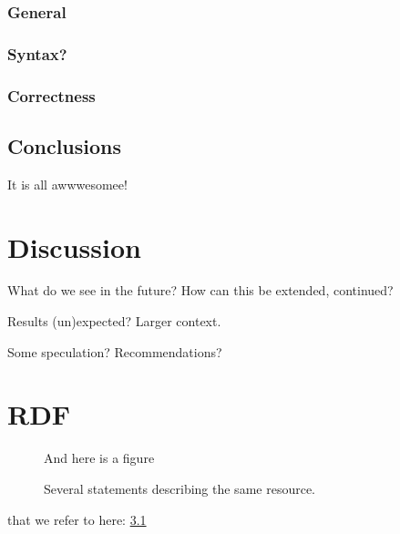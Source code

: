 \documentclass[a4paper,11pt]{kth-mag}
\begin{document}
\subsection{General}

\subsection{Syntax?}

\subsection{Correctness}


\section{Conclusions}

It is all awwwesomee!

\pagestyle{newchap}
\chapter{Discussion}

What do we see in the future? How can this be extended, continued?

Results (un)expected? Larger context.

Some speculation? Recommendations?

\appendix
\addappheadtotoc
\chapter{RDF}\label{appA}

\begin{figure}[ht]
\begin{center}
And here is a figure
\caption{\small{Several statements describing the same resource.}}\label{RDF_4}
\end{center}
\end{figure}

that we refer to here: \ref{RDF_4}



\end{document}
